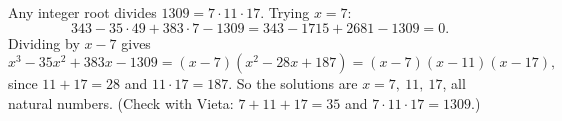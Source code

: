 Any integer root divides $1309=7\cdot11\cdot17$. Trying $x=7$:
\[343-35\cdot49+383\cdot7-1309=343-1715+2681-1309=0.\]
Dividing by $x-7$ gives
\[x^3-35x^2+383x-1309=(x-7)\left(x^2-28x+187\right)=(x-7)(x-11)(x-17),\]
since $11+17=28$ and $11\cdot17=187$. So the solutions are $\boxed{x=7,\ 11,\ 17}$, all natural numbers. (Check with Vieta: $7+11+17=35$ and $7\cdot11\cdot17=1309$.)
